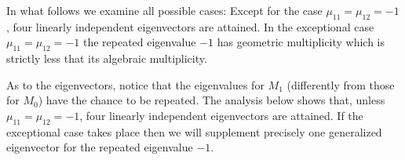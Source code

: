 \documentclass[usletter,11pt]{article}
\theoremstyle{remark}
\begin{document}

In what follows we examine all possible cases:  Except for the case $\mu_{11}=\mu_{12}=-1$, four linearly independent eigenvectors are attained. 
In the exceptional case $\mu_{11}=\mu_{12}=-1$ the repeated eigenvalue $-1$ has geometric multiplicity which is strictly less that its  algebraic multiplicity.

As to the eigenvectors, notice that the eigenvalues for $M_1$  (differently from those for $M_0$) have the chance to be repeated. The analysis below 
shows  that, unless $\mu_{11}=\mu_{12}=-1$, four linearly independent eigenvectors are attained. If the exceptional case takes place then 
we will supplement precisely one generalized eigenvector for the repeated eigenvalue $-1$.
\end{document}
